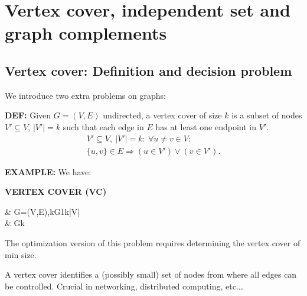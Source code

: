 \section{Vertex cover, independent set and graph complements}
\subsection{Vertex cover: Definition and decision problem}
We introduce two extra problems on graphs:

\begin{notesdefinition}
\textbf{DEF:} Given $G=(V,E)$ undirected, a vertex cover of size $k$ is a subset of nodes $V'\subseteq V$, $|V'|=k$ such that each edge in $E$ has at least one endpoint in $V'$.
\[
\begin{gathered}
V'\subseteq V,\ |V'|=k:\ \forall u\neq v\in V:\\
\{u,v\}\in E\Rightarrow(u\in V')\lor(v\in V').
\end{gathered}
\]
\end{notesdefinition}

\textbf{EXAMPLE:}
We have:

\textbf{VERTEX COVER (VC)}

\begin{notesproblem}
 & \langle G=(V,E),k\rangle\text{, }G1\leq k\leq|V|\\
 & Gk
\end{notesproblem}

The optimization version of this problem requires determining the vertex cover of min size.

A vertex cover identifies a (possibly small) set of nodes from where all edges can be controlled. Crucial in networking, distributed computing, etc.\ldots

